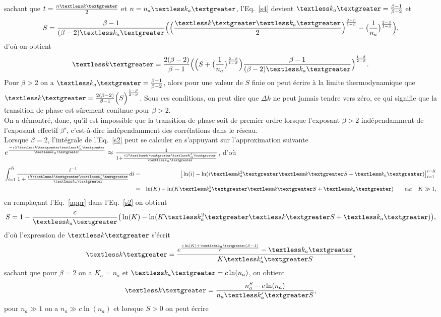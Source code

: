 sachant que $t=\frac{n\km}{2}$ et $n=n_a\kma$, l'Eq.~\eqref{s4} devient
 $\kma=\frac{\beta-1}{\beta-2}$ et
\begin{equation}
S=\frac{\beta-1}{(\beta-2)\kma}\Big(\Big(\frac{\km \kma}{2}\Big)^{\frac{2-\beta}{1-\beta}}-\big(\frac{1}{n_a}\big)^{\frac{2-\beta}{1-\beta}}\Big),
\label{s5}
\end{equation}
d'où on obtient 
\begin{equation}
\km=\frac{2(\beta-2)}{\beta-1}\Big(\Big(S+\big(\frac{1}{n_a}\big)^{\frac{2-\beta}{1-\beta}}\Big)\frac{\beta-1}{(\beta-2)\kma}\Big)^{\frac{1-\beta}{2-\beta}}.
\end{equation}
Pour $\beta>2$ on a $\kma=\frac{\beta-1}{\beta-2}$, alors pour une valeur de $S$ finie on peut écrire à la limite thermodynamique que $ \km=\frac{2(\beta-2)}{\beta-1}\Big(S\Big)^{\frac{1-\beta}{2-\beta}}$. Sous ces conditions, on peut dire que $\Delta k$ ne peut jamais tendre vers zéro,  ce qui signifie que la transition de phase est sûrement conitnue pour $\beta>2$.\\
On a démontré, donc, qu'il est impossible que la transition de phase soit de premier ordre lorsque l'exposant $\beta>2$  indépendamment de l'exposant effectif $\beta'$, c'est-à-dire indépendamment des corrélations dans le réseau.\\
Lorsque $\beta=2$, l'intégrale de l'Eq.~\eqref{s2} peut se calculer en s'appuyant sur l'approximation suivante  $e^{\frac{-iS\km\kmap}{\kma}}\approx \frac{1}{1+\frac{iS\km\kmap}{\kma}}$, d'où
\begin{eqnarray}
\int_{i=1}^K\frac{i^{-1}}{1+\frac{iS\km\kmap}{\kma}}di&=&\big[\ln(i)-\ln(i\kmaa\km S+\kma)\big]_{i=1}^{i=K}\nonumber\\
&=&\ln(K)-\ln(K\kmaa\km S+\kma)  \quad \quad  \text{car} \quad K\gg 1,
\label{appr}
\end{eqnarray}
en remplaçant l'Eq.~\eqref{appr} dans l'Eq.~\eqref{s2} on obtient 
\begin{equation}
S=1-\frac{c}{\kma}\big(\ln(K)-\ln(K\kmaa\km S+\kma)\big),
\end{equation}
d'où l'expression de $\km$ s'écrit
\begin{equation}
\km=\frac{e^{\frac{c\ln(K)+\kma(S-1)}{c}}-\kma}{K\kmap S},
\end{equation}
sachant que pour $\beta=2$ on a $K_a=n_a$ et $\kma=c\ln(n_a)$, on obtient
\begin{equation}
\km=\frac{n_a^S-c\ln(n_a)}{n_a\kmap S},
\end{equation}
pour $n_a\gg1$ on a $n_a\gg c\ln(n_a)$ et lorsque $S>0$ on peut écrire

